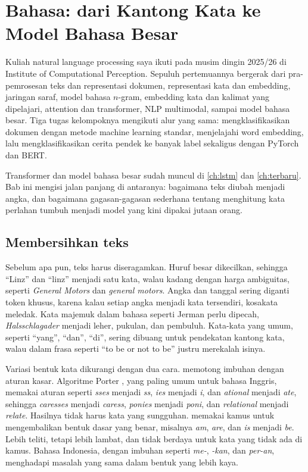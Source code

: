 \chapter{Bahasa: dari Kantong Kata ke Model Bahasa Besar}
\label{ch:nlp}

Kuliah natural language processing saya ikuti pada musim dingin 2025/26 di Institute of Computational Perception. Sepuluh
pertemuannya bergerak dari pra-pemrosesan teks dan representasi dokumen, representasi kata dan embedding, jaringan saraf,
model bahasa $n$-gram, embedding kata dan kalimat yang dipelajari, attention dan transformer, NLP multimodal, sampai model bahasa
besar. Tiga tugas kelompoknya mengikuti alur yang sama: mengklasifikasikan dokumen dengan metode machine learning standar,
menjelajahi word embedding, lalu mengklasifikasikan cerita pendek ke banyak label sekaligus dengan PyTorch dan BERT.

Transformer dan model bahasa besar sudah muncul di \cref{ch:lstm} dan \cref{ch:terbaru}. Bab ini mengisi jalan panjang di
antaranya: bagaimana teks diubah menjadi angka, dan bagaimana gagasan-gagasan sederhana tentang menghitung kata perlahan tumbuh
menjadi model yang kini dipakai jutaan orang.

\section{Membersihkan teks}

Sebelum apa pun, teks harus diseragamkan. Huruf besar dikecilkan, sehingga ``Linz'' dan ``linz'' menjadi satu kata, walau
kadang dengan harga ambiguitas, seperti \emph{General Motors} dan \emph{general motors}. Angka dan tanggal sering diganti token
khusus, karena kalau setiap angka menjadi kata tersendiri, kosakata meledak. Kata majemuk dalam bahasa seperti Jerman perlu
dipecah, \emph{Halsschlagader} menjadi leher, pukulan, dan pembuluh. Kata-kata yang umum,  seperti
``yang'', ``dan'', ``di'', sering dibuang untuk pendekatan kantong kata, walau dalam frasa seperti ``to be or not to be'' justru
merekalah isinya.

Variasi bentuk kata dikurangi dengan dua cara.  memotong imbuhan dengan aturan kasar. Algoritme Porter
\citep{porter1980}, yang paling umum untuk bahasa Inggris, memakai aturan seperti \emph{sses} menjadi \emph{ss}, \emph{ies}
menjadi \emph{i}, dan \emph{ational} menjadi \emph{ate}, sehingga \emph{caresses} menjadi \emph{caress}, \emph{ponies} menjadi
\emph{poni}, dan \emph{relational} menjadi \emph{relate}. Hasilnya tidak harus kata yang sungguhan.  memakai
kamus untuk mengembalikan bentuk dasar yang benar, misalnya \emph{am}, \emph{are}, dan \emph{is} menjadi \emph{be}. Lebih teliti,
tetapi lebih lambat, dan tidak berdaya untuk kata yang tidak ada di kamus. Bahasa Indonesia, dengan imbuhan seperti
\emph{me-}, \emph{-kan}, dan \emph{per-an}, menghadapi masalah yang sama dalam bentuk yang lebih kaya.

